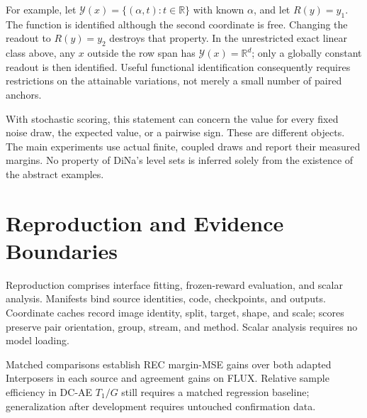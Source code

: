 \documentclass[10pt,twocolumn,letterpaper]{article}
\newcommand{\R}{\mathbb R}\newcommand{\E}{\mathbb E}
\begin{document}
For example, let $\mathcal Y(x)=\{(\alpha,t):t\in\R\}$ with known $\alpha$, and let $R(y)=y_1$. The function is identified although the second coordinate is free. Changing the readout to $R(y)=y_2$ destroys that property. In the unrestricted exact linear class above, any $x$ outside the row span has $\mathcal Y(x)=\R^d$; only a globally constant readout is then identified. Useful functional identification consequently requires restrictions on the attainable variations, not merely a small number of paired anchors.

With stochastic scoring, this statement can concern the value for every fixed noise draw, the expected value, or a pairwise sign. These are different objects. The main experiments use actual finite, coupled draws and report their measured margins. No property of DiNa's level sets is inferred solely from the existence of the abstract examples.



\section{Reproduction and Evidence Boundaries}
Reproduction comprises interface fitting, frozen-reward evaluation, and scalar analysis. Manifests bind source identities, code, checkpoints, and outputs. Coordinate caches record image identity, split, target, shape, and scale; scores preserve pair orientation, group, stream, and method. Scalar analysis requires no model loading.

Matched comparisons establish REC margin-MSE gains over both adapted Interposers in each source and agreement gains on FLUX. Relative sample efficiency in DC-AE $T_1/G$ still requires a matched regression baseline; generalization after development requires untouched confirmation data.

{\small}
\end{document}
